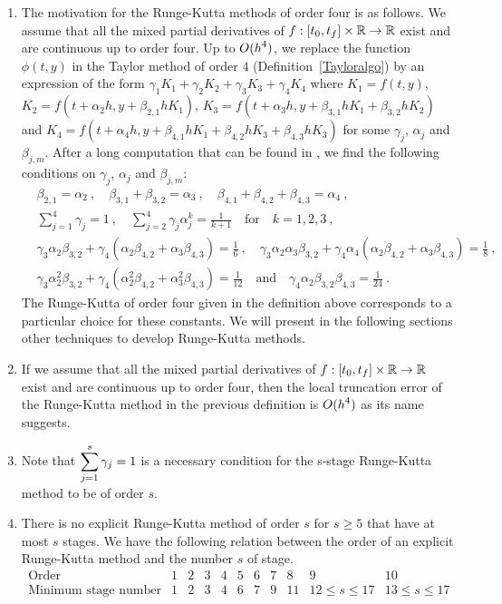 \begin{rmkList}
\begin{enumerate}
\item The motivation for the Runge-Kutta methods of order four is as
follows.  We assume that all the mixed partial derivatives of
$f:[t_0,t_f]\times \mathbb{R} \rightarrow \mathbb{R}$ exist and are continuous up to
order four.  Up to $\displaystyle O(h^4)$, we replace the function
$\phi(t,y)$ in the Taylor method of order $4$
(Definition~\ref{Tayloralgo}) by an
expression of the form $\gamma_1 K_1 + \gamma_2 K_2 + \gamma_3 K_3 +
\gamma_4 K_4$ where
$K_1=f(t,y)$, $K_2=f(t+\alpha_2 h,y+\beta_{2,1} h K_1)$,
$K_3=f(t+\alpha_3 h,y+\beta_{3,1} h K_1 + \beta_{3,2} h K_2)$ and
$K_4=f(t+\alpha_4 h,y+\beta_{4,1} h K_1 + \beta_{4,2} h K_3 +
\beta_{4,3} h K_3)$ for some $\gamma_j$,
$\alpha_j$ and $\beta_{j,m}$.
After a long computation that can be found in \cite{La}, we find
the following conditions on $\gamma_j$, $\alpha_j$ and $\beta_{j,m}$:
\begin{align*}
& \beta_{2,1} = \alpha_2 \ , \quad
\beta_{3,1} + \beta_{3,2} = \alpha_3 \ , \quad
\beta_{4,1} + \beta_{4,2} + \beta_{4,3} = \alpha_4 \ ,\\
& \sum_{j=1}^4 \gamma_j = 1 \ , \quad
\sum_{j=2}^4 \gamma_j \alpha_j^k = \frac{1}{k+1} \quad \text{for}
\quad k =1,2,3 \ , \\
&\gamma_3 \alpha_2 \beta_{3,2} + \gamma_4 ( \alpha_2 \beta_{4,2} +
\alpha_3 \beta_{4,3}) = \frac{1}{6} \ , \quad
\gamma_3 \alpha_2 \alpha_3 \beta_{3,2} + \gamma_4 \alpha_4 ( \alpha_2
\beta_{4,2} + \alpha_3 \beta_{4,3}) = \frac{1}{8} \ ,\\
&\gamma_3 \alpha_2^2 \beta_{3,2} + \gamma_4 ( \alpha_2^2
\beta_{4,2} + \alpha_3^2 \beta_{4,3}) = \frac{1}{12}
\quad \text{and} \quad
\gamma_4 \alpha_2 \beta_{3,2} \beta_{4,3} = \frac{1}{24} \ .
\end{align*}
The Runge-Kutta of order four given in the definition above
corresponds to a particular choice for these constants.
We will present in the following sections other techniques to develop
Runge-Kutta methods.
\item If we assume that all the mixed partial derivatives of
$f:[t_0,t_f]\times \mathbb{R} \rightarrow \mathbb{R}$ exist and are continuous up to
order four, then the local truncation error of the Runge-Kutta method
in the previous definition is $\displaystyle O(h^4)$ as its name suggests.
\item Note that $\displaystyle \sum_{j=1}^s \gamma_j = 1$ is a
necessary condition for the s-stage Runge-Kutta method to be of
order $s$.
\item There is no explicit Runge-Kutta method of order $s$ for
$s\geq 5$ that have at most $s$ stages.  We have the following
relation between the order of an explicit Runge-Kutta method and the
number $s$ of stage.
\[
\begin{array}{l|cccccccccc}
\text{Order} & 1 & 2 & 3 & 4 & 5 & 6 & 7 & 8 & 9 & 10 \\
\hline
\text{Minimum stage number} & 1 & 2 & 3 & 4 & 6 & 7 & 9 & 11 &
12 \leq s \leq 17 & 13 \leq s \leq 17
\end{array}
\]
\end{enumerate}
\end{rmkList}


